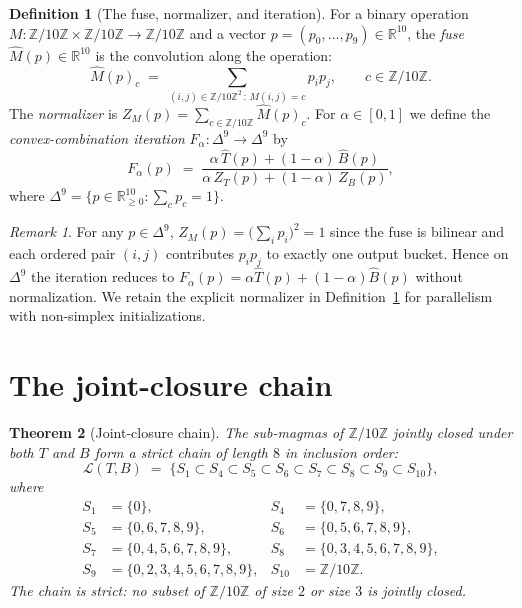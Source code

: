 \documentclass[11pt,reqno]{amsart}
\theoremstyle{plain}
\newtheorem{theorem}{Theorem}
\theoremstyle{definition}
\newtheorem{definition}[theorem]{Definition}
\theoremstyle{remark}
\newtheorem*{remark}{Remark}
\newcommand{\Z}{\mathbb{Z}}
\newcommand{\R}{\mathbb{R}}
\newcommand{\Zten}{\Z/10\Z}
\newcommand{\Tfuse}{\widehat{T}}
\newcommand{\Bfuse}{\widehat{B}}
\newcommand{\Fmix}{F_{\alpha}}
\newcommand{\Simp}{\Delta^{9}}
\begin{document}
\begin{definition}[The fuse, normalizer, and iteration]\label{def:fuse}
For a binary operation $M:\Zten\times\Zten\to\Zten$ and a vector
$p=(p_{0},\dots,p_{9})\in\R^{10}$, the \emph{fuse}
$\widehat{M}(p)\in\R^{10}$ is the convolution along the operation:
\[
\widehat{M}(p)_{c}\;=\;\sum_{(i,j)\in\Zten^{2}\,:\,M(i,j)=c}p_{i}p_{j},
\qquad c\in\Zten.
\]
The \emph{normalizer} is $Z_{M}(p)=\sum_{c\in\Zten}\widehat{M}(p)_{c}$.
For $\alpha\in[0,1]$ we define the \emph{convex-combination
iteration} $\Fmix:\Simp\to\Simp$ by
\[
\Fmix(p)\;=\;\frac{\alpha\,\widehat{T}(p)+(1-\alpha)\,\widehat{B}(p)}{\alpha\,Z_{T}(p)+(1-\alpha)\,Z_{B}(p)},
\]
where $\Simp=\{p\in\R^{10}_{\geq 0}:\sum_{c}p_{c}=1\}$.
\end{definition}

\begin{remark}
For any $p\in\Simp$, $Z_{M}(p)=\bigl(\sum_{i}p_{i}\bigr)^{2}=1$
since the fuse is bilinear and each ordered pair $(i,j)$
contributes $p_{i}p_{j}$ to exactly one output bucket. Hence on
$\Simp$ the iteration reduces to
$\Fmix(p)=\alpha\Tfuse(p)+(1-\alpha)\Bfuse(p)$ without
normalization. We retain the explicit normalizer in
Definition~\ref{def:fuse} for parallelism with non-simplex
initializations.
\end{remark}

\section{The joint-closure chain}\label{sec:chain}

\begin{theorem}[Joint-closure chain]\label{thm:chain}
The sub-magmas of $\Zten$ jointly closed under both $T$ and $B$
form a strict chain of length $8$ in inclusion order:
\[
\mathcal{L}(T,B)\;=\;\bigl\{S_{1}\subset S_{4}\subset S_{5}\subset
S_{6}\subset S_{7}\subset S_{8}\subset S_{9}\subset S_{10}\bigr\},
\]
where
\begin{align*}
S_{1}&=\{0\}, & S_{4}&=\{0,7,8,9\}, \\
S_{5}&=\{0,6,7,8,9\}, & S_{6}&=\{0,5,6,7,8,9\}, \\
S_{7}&=\{0,4,5,6,7,8,9\}, & S_{8}&=\{0,3,4,5,6,7,8,9\}, \\
S_{9}&=\{0,2,3,4,5,6,7,8,9\}, & S_{10}&=\Zten.
\end{align*}
The chain is strict: no subset of $\Zten$ of size $2$ or size $3$
is jointly closed.
\end{theorem}
\end{document}
